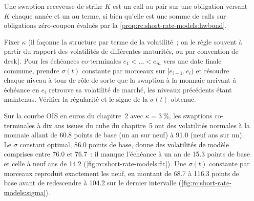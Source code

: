 Une swaption receveuse de strike $K$ est un call au pair sur une obligation versant $K$
chaque année et un au terme, si bien qu'elle est une somme de calls sur obligations zéro-coupon
évalués par la \cref{prop:rc:short-rate-models:hwbond}.

\label{lst:rc:short-rate-models:jamshidian}

\begin{method}\label{met:rc:short-rate-models:coterminal}
Fixer $\kappa$ (il façonne la structure par terme de la volatilité~; on le règle souvent à partir du
rapport des volatilités de différentes maturités, ou par convention de desk). Pour les
échéances co-terminales $e_1<\dots<e_m$ vers une date finale commune, prendre
$\sigma(t)$ constante par morceaux sur $[e_{i-1},e_i)$ et résoudre chaque niveau à tour de rôle
de sorte que la swaption à la monnaie arrivant à échéance en $e_i$ retrouve sa volatilité
de marché, les niveaux précédents étant maintenus. Vérifier la régularité et le signe de la
$\sigma(t)$ obtenue.
\end{method}

\begin{example}\label{ex:rc:short-rate-models:fit}
Sur la courbe OIS en euros du chapitre~2 avec $\kappa=3~\%$, les swaptions co-terminales
à dix ans issues du cube du chapitre~5 ont des volatilités normales à la monnaie allant de
60.8 points de base (un an sur neuf) à 91.0 (neuf ans sur un). Le $\sigma$ constant
optimal, 86.0 points de base, donne des volatilités de modèle comprises entre 76.0 et 76.7~: il
manque l'échéance à un an de 15.3 points de base et celle à neuf ans de 14.2
(\cref{fig:rc:short-rate-models:fit}). Une $\sigma(t)$ constante par morceaux reproduit exactement
les neuf, en montant de 68.7 à 116.3 points de base avant de redescendre à 104.2 sur
le dernier intervalle (\cref{fig:rc:short-rate-models:sigma}).
\end{example}

